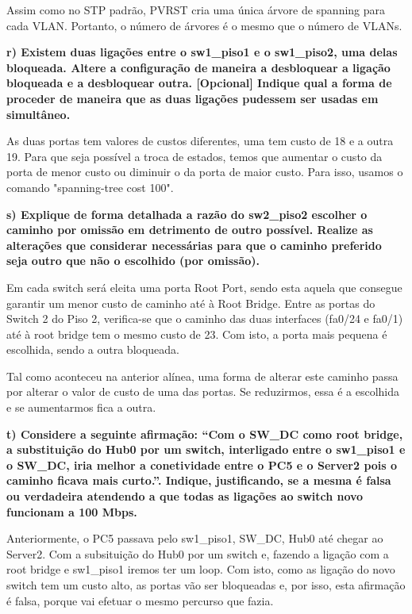 \documentclass[11pt,english, openright, oneside]{book}
\begin{document}
Assim como no STP padrão, PVRST cria uma única árvore de spanning para cada
VLAN. Portanto, o número de árvores é o mesmo que o número de VLANs.
\vspace{0.8cm}

\newpage
\textbf{r) Existem duas ligações entre o sw1\_piso1 e o sw1\_piso2, uma delas bloqueada. Altere a configuração de maneira a desbloquear a ligação bloqueada e a desbloquear outra. [Opcional] Indique qual a forma de proceder de maneira que as duas ligações pudessem ser usadas em simultâneo.}
\vspace{0.2cm}

 As duas portas tem valores de custos diferentes, uma tem custo de 18 e a outra
 19. Para que seja possível a troca de estados, temos que aumentar o custo da
 porta de menor custo ou diminuir o da porta de maior custo. Para isso, usamos o
 comando "spanning-tree cost 100".
 
\vspace{0.8cm}


\textbf{s) Explique de forma detalhada a razão do sw2\_piso2 escolher o caminho por omissão em detrimento de outro possível. Realize as alterações que considerar necessárias para que o caminho preferido seja outro que não o escolhido (por omissão).}
\vspace{0.2cm}

Em cada switch será eleita uma porta Root Port, sendo esta aquela que consegue
garantir um menor custo de caminho até à Root Bridge. Entre as portas do Switch
2 do Piso 2, verifica-se que o caminho das duas interfaces (fa0/24 e fa0/1) até
à root bridge tem o mesmo custo de 23. Com isto, a porta mais pequena é
escolhida, sendo a outra bloqueada. 

Tal como aconteceu na anterior alínea, uma forma de alterar este caminho passa
por alterar o valor de custo de uma das portas. Se reduzirmos, essa é a
escolhida e se aumentarmos fica a outra. 
\vspace{0.8cm}


\textbf{t) Considere a seguinte afirmação: “Com o SW\_DC como root bridge, a substituição do Hub0 por um switch, interligado entre o sw1\_piso1 e o SW\_DC, iria melhor a conetividade entre o PC5 e o Server2 pois o caminho ficava mais curto.”. Indique, justificando, se a mesma é falsa ou verdadeira atendendo a que todas as ligações ao switch novo funcionam a 100 Mbps.}
\vspace{0.2cm}
 
Anteriormente, o PC5 passava pelo sw1\_piso1, SW\_DC, Hub0 até chegar ao
Server2. Com a subsituição do Hub0 por um switch e, fazendo a ligação com a root
bridge e sw1\_piso1 iremos ter um loop. Com isto, como as ligação do novo switch
tem um custo alto, as portas vão ser bloqueadas e, por isso, esta afirmação é
falsa, porque vai efetuar o mesmo percurso que fazia.
\vspace{0.8cm}
\end{document}

